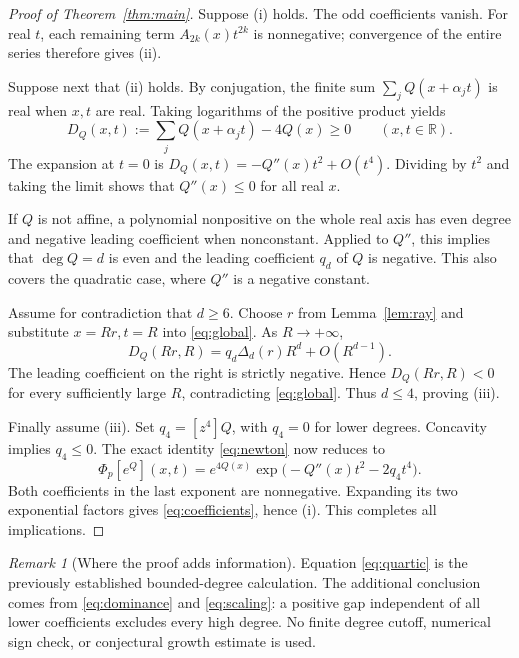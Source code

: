 \documentclass[11pt,a4paper]{article}
\theoremstyle{remark}\newtheorem{remark}[theorem]{Remark}
\newcommand{\R}{\mathbb R}\newcommand{\C}{\mathbb C}
\newcommand{\Ph}{\Phi_p}
\begin{document}
\begin{proof}[Proof of Theorem~\ref{thm:main}]
Suppose \textup{(i)} holds. The odd coefficients vanish. For real $t$,
each remaining term $A_{2k}(x)t^{2k}$ is nonnegative; convergence of the
entire series therefore gives \textup{(ii)}.

Suppose next that \textup{(ii)} holds. By conjugation, the finite sum
$\sum_jQ(x+\alpha_jt)$ is real when $x,t$ are real. Taking logarithms
of the positive product yields
\begin{equation}\label{eq:global}
 D_Q(x,t):=\sum_jQ(x+\alpha_jt)-4Q(x)\ge0
                   \qquad(x,t\in\R).
\end{equation}
The expansion at $t=0$ is
$D_Q(x,t)=-Q''(x)t^2+O(t^4)$. Dividing by $t^2$ and taking the limit
shows that $Q''(x)\le0$ for all real $x$.

If $Q$ is not affine, a polynomial nonpositive on the whole real axis
has even degree and negative leading coefficient when nonconstant.
Applied to $Q''$, this implies that $\deg Q=d$ is even and the leading
coefficient $q_d$ of $Q$ is negative. This also covers the quadratic
case, where $Q''$ is a negative constant.

Assume for contradiction that $d\ge6$. Choose $r$ from
Lemma~\ref{lem:ray} and substitute $x=Rr,t=R$ into \eqref{eq:global}.
As $R\to+\infty$,
\begin{equation}\label{eq:scaling}
 D_Q(Rr,R)=q_d\Delta_d(r)R^d+O(R^{d-1}).
\end{equation}
The leading coefficient on the right is strictly negative. Hence
$D_Q(Rr,R)<0$ for every sufficiently large $R$, contradicting
\eqref{eq:global}. Thus $d\le4$, proving \textup{(iii)}.

Finally assume \textup{(iii)}. Set $q_4=[z^4]Q$, with $q_4=0$ for
lower degrees. Concavity implies $q_4\le0$. The exact identity
\eqref{eq:newton} now reduces to
\begin{equation}\label{eq:quartic}
 \Ph[e^Q](x,t)=e^{4Q(x)}
       \exp\bigl(-Q''(x)t^2-2q_4t^4\bigr).
\end{equation}
Both coefficients in the last exponent are nonnegative. Expanding its
two exponential factors gives \eqref{eq:coefficients}, hence
\textup{(i)}. This completes all implications.
\end{proof}

\begin{remark}[Where the proof adds information]
Equation \eqref{eq:quartic} is the previously established bounded-degree
calculation. The additional conclusion comes from
\eqref{eq:dominance} and \eqref{eq:scaling}: a positive gap independent
of all lower coefficients excludes every high degree. No finite degree
cutoff, numerical sign check, or conjectural growth estimate is used.
\end{remark}
\end{document}

